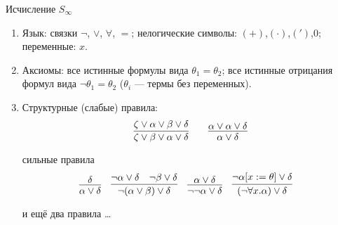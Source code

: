 \documentclass[handout]{beamer}
\newtheorem{lmm}{Лемма}[section]
\begin{document}

%

\begin{frame}{Исчисление $S_\infty$}
\begin{enumerate}
\item Язык: связки $\neg$, $\vee$, $\forall$, $=$; нелогические символы: $(+)$,$(\cdot)$,$(')$,$0$; переменные: $x$.
\item Аксиомы: все истинные формулы вида $\theta_1=\theta_2$; все истинные отрицания формул вида $\neg\theta_1=\theta_2$
($\theta_i$ --- термы без переменных).
\item Структурные (слабые) правила:
$$\infer{\zeta\vee\beta\vee\alpha\vee\delta}{\zeta\vee\alpha\vee\beta\vee\delta} \quad\quad
\infer{\alpha\vee\delta}{\alpha\vee\alpha\vee\delta}$$

сильные правила
$$\infer{\alpha\vee\delta}{\delta}\quad
\infer{\neg(\alpha\vee\beta)\vee\delta}{\neg\alpha\vee\delta\quad\neg\beta\vee\delta}\quad
\infer{\neg\neg\alpha\vee\delta}{\alpha\vee\delta}\quad
\infer{(\neg\forall x.\alpha)\vee\delta}{\neg\alpha[x := \theta]\vee\delta}\quad$$

и ещё два правила \dots
\end{enumerate}
\end{frame}
\end{document}
